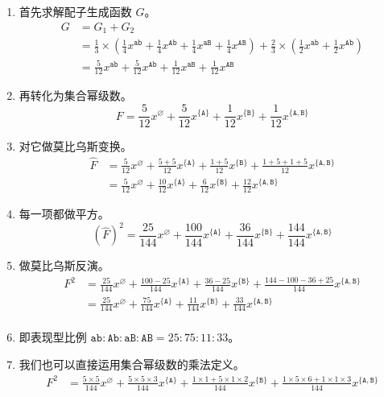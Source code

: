 \documentclass[12pt]{article} %
\begin{document}
\begin{enumerate}
	\item 首先求解配子生成函数 $G$。\\ 
		$$
		\begin{aligned}
			G &= G_1+G_2 \\
			  &= \frac{1}{3} \times (\frac{1}{4}x^{\texttt{ab}}+\frac{1}{4}x^{\texttt{Ab}}+\frac{1}{4}x^{\texttt{aB}}+\frac{1}{4}x^{\texttt{AB}})+\frac{2}{3} \times (\frac{1}{2}x^{\texttt{ab}} + \frac{1}{2}x^{\texttt{Ab}}) \\
			  &= \frac{5}{12} x^{\texttt{ab}} + \frac{5}{12} x^{\texttt{Ab}} + \frac{1}{12} x^{\texttt{aB}} + \frac{1}{12} x^{\texttt{AB}}
		\end{aligned}
		$$
	\item 再转化为集合幂级数。\\
		$$F = \frac{5}{12} x^{\varnothing} + \frac{5}{12} x^{\{\texttt{A}\}} + \frac{1}{12} x^{\{\texttt{B}\}} + \frac{1}{12} x^{\{\texttt{A},\texttt{B}\}}$$
	\item 对它做莫比乌斯变换。\\
		$$
		\begin{aligned}
			\hat F &= \frac{5}{12} x^{\varnothing} + \frac{5+5}{12} x^{\{\texttt{A}\}} + \frac{1+5}{12} x^{\{\texttt{B}\}} + \frac{1+5+1+5}{12} x^{\{\texttt{A},\texttt{B}\}} \\
			  &= \frac{5}{12} x^{\varnothing} + \frac{10}{12} x^{\{\texttt{A}\}} + \frac{6}{12} x^{\{\texttt{B}\}} + \frac{12}{12} x^{\{\texttt{A},\texttt{B}\}}
		\end{aligned}
		$$
	\item 每一项都做平方。\\
		$$(\hat F)^2=\frac{25}{144} x^{\varnothing} + \frac{100}{144} x^{\{\texttt{A}\}} + \frac{36}{144} x^{\{\texttt{B}\}} + \frac{144}{144} x^{\{\texttt{A},\texttt{B}\}}$$
	\item 做莫比乌斯反演。\\
		$$
		\begin{aligned}
			F^2 &= \frac{25}{144} x^{\varnothing} + \frac{100-25}{144} x^{\{\texttt{A}\}} + \frac{36-25}{144} x^{\{\texttt{B}\}} + \frac{144-100-36+25}{144} x^{\{\texttt{A},\texttt{B}\}} \\
			  &= \frac{25}{144} x^{\varnothing} + \frac{75}{144} x^{\{\texttt{A}\}} + \frac{11}{144} x^{\{\texttt{B}\}} + \frac{33}{144} x^{\{\texttt{A},\texttt{B}\}} \\
		\end{aligned}
		$$
	\item 即表现型比例 $\texttt{ab} : \texttt{Ab} : \texttt{aB} : \texttt{AB}=25:75:11:33$。
	\item 我们也可以直接运用集合幂级数的乘法定义。\\
		$$
		\begin{aligned}
			F^2 &= \frac{5 \times 5}{144} x^{\varnothing} + \frac{5 \times 5 \times 3}{144} x^{\{\texttt{A}\}} + \frac{1 \times 1 + 5 \times 1 \times 2}{144} x^{\{\texttt{B}\}} + \frac{1 \times 5 \times 6 + 1 \times 1 \times 3}{144} x^{\{\texttt{A},\texttt{B}\}}
		\end{aligned}
		$$
\end{enumerate}
\end{document}
